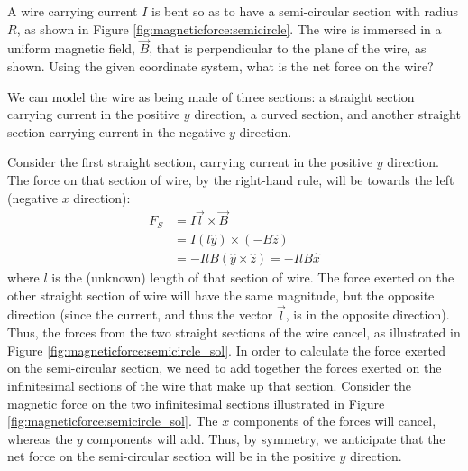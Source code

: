 \begin{example}{\label{ex:magneticforce:semicircle}A wire carrying current $I$ is bent so as to have a semi-circular section with radius $R$, as shown in Figure \ref{fig:magneticforce:semicircle}. The wire is immersed in a uniform magnetic field, $\vec B$, that is perpendicular to the plane of the wire, as shown. Using the given coordinate system, what is the net force on the wire? }

We can model the wire as being made of three sections: a straight section carrying current in the positive $y$ direction, a curved section, and another straight section carrying current in the negative $y$ direction.

Consider the first straight section, carrying current in the positive $y$ direction. The force on that section of wire, by the right-hand rule, will be towards the left (negative $x$ direction):
\begin{align*}
F_S &= I \vec l \times \vec B\\
&= I (l\hat y) \times (-B\hat z)\\
&= -IlB (\hat y \times \hat z)=-IlB\hat x
\end{align*}
where $l$ is the (unknown) length of that section of wire. The force exerted on the other straight section of wire will have the same magnitude, but the opposite direction (since the current, and thus the vector $\vec l$, is in the opposite direction). Thus, the forces from the two straight sections of the wire cancel, as illustrated in Figure \ref{fig:magneticforce:semicircle_sol}.
In order to calculate the force exerted on the semi-circular section, we need to add together the forces exerted on the infinitesimal sections of the wire that make up that section. Consider the magnetic force on the two infinitesimal sections illustrated in Figure \ref{fig:magneticforce:semicircle_sol}. The $x$ components of the forces will cancel, whereas the $y$ components will add. Thus, by symmetry, we anticipate that the net force on the semi-circular section will be in the positive $y$ direction.


\end{example}
